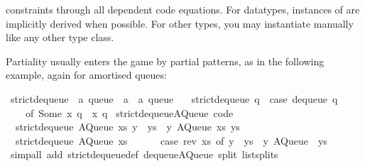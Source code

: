 \begin{isabellebody}
\begin{isamarkuptext}
   constraints through all dependent code equations.
  For datatypes, instances of  are implicitly derived
  when possible.  For other types, you may instantiate 
  manually like any other type class.%
\end{isamarkuptext}%
\isamarkuptrue%
%
\isamarkuptrue%
%
\begin{isamarkuptext}%
Partiality usually enters the game by partial patterns, as
  in the following example, again for amortised queues:%
\end{isamarkuptext}%
\isamarkuptrue%
%
\isadelimquote
%
\endisadelimquote
%
\isatagquote
{}\isamarkupfalse%
\ strict{\isacharunderscore}dequeue\ {\isacharcolon}{\isacharcolon}\ {\isachardoublequoteopen}{\isacharprime}a\ queue\ {\isasymRightarrow}\ {\isacharprime}a\ {\isasymtimes}\ {\isacharprime}a\ queue{\isachardoublequoteclose}\ \isanewline
\ \ {\isachardoublequoteopen}strict{\isacharunderscore}dequeue\ q\ {\isacharequal}\ {\isacharparenleft}case\ dequeue\ q\isanewline
\ \ \ \ of\ {\isacharparenleft}Some\ x{\isacharcomma}\ q{\isacharprime}{\isacharparenright}\ {\isasymRightarrow}\ {\isacharparenleft}x{\isacharcomma}\ q{\isacharprime}{\isacharparenright}{\isacharparenright}{\isachardoublequoteclose}\isanewline
\isanewline
{}\isamarkupfalse%
\ strict{\isacharunderscore}dequeue{\isacharunderscore}AQueue\ {\isacharbrackleft}code{\isacharbrackright}{\isacharcolon}\isanewline
\ \ {\isachardoublequoteopen}strict{\isacharunderscore}dequeue\ {\isacharparenleft}AQueue\ xs\ {\isacharparenleft}y\ {\isacharhash}\ ys{\isacharparenright}{\isacharparenright}\ {\isacharequal}\ {\isacharparenleft}y{\isacharcomma}\ AQueue\ xs\ ys{\isacharparenright}{\isachardoublequoteclose}\isanewline
\ \ {\isachardoublequoteopen}strict{\isacharunderscore}dequeue\ {\isacharparenleft}AQueue\ xs\ {\isacharbrackleft}{\isacharbrackright}{\isacharparenright}\ {\isacharequal}\isanewline
\ \ \ \ {\isacharparenleft}case\ rev\ xs\ of\ y\ {\isacharhash}\ ys\ {\isasymRightarrow}\ {\isacharparenleft}y{\isacharcomma}\ AQueue\ {\isacharbrackleft}{\isacharbrackright}\ ys{\isacharparenright}{\isacharparenright}{\isachardoublequoteclose}\isanewline
\ \ \isamarkupfalse%
\ {\isacharparenleft}simp{\isacharunderscore}all\ add{\isacharcolon}\ strict{\isacharunderscore}dequeue{\isacharunderscore}def\ dequeue{\isacharunderscore}AQueue\ split{\isacharcolon}\ list{\isachardot}splits{\isacharparenright}%
\endisatagquote
{\isafoldquote}%
%
\isadelimquote
%
\endisadelimquote

\end{isabellebody}
